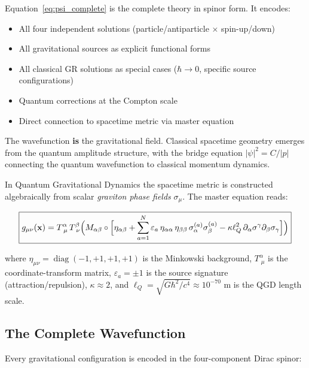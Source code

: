 \documentclass[11pt,a4paper]{article}
\theoremstyle{definition}
\theoremstyle{remark}
\newcommand{\sig}[2]{\sigma_{#1}^{(#2)}}
\newcommand{\lQ}{\ell_{Q}}
\newcommand{\boldx}{\mathbf{x}}
\begin{document}
	Equation~\eqref{eq:psi_complete} is the complete theory in spinor form. It encodes:
	
	\begin{itemize}
		\item All four independent solutions (particle/antiparticle $\times$ spin-up/down)
		\item All gravitational sources as explicit functional forms
		\item All classical GR solutions as special cases ($\hbar \to 0$, specific source configurations)
		\item Quantum corrections at the Compton scale
		\item Direct connection to spacetime metric via master equation
	\end{itemize}
	
	The wavefunction \textbf{is} the gravitational field. Classical spacetime geometry emerges from the quantum amplitude structure, with the bridge equation $|\psi|^2 = C/|p|$ connecting the quantum wavefunction to classical momentum dynamics.
	
	
	In Quantum Gravitational Dynamics the spacetime metric is constructed
	algebraically from scalar \emph{graviton phase fields} $\sigma_\mu$.
	The master equation reads:
	
	\begin{equation}\label{eq:master}
		\boxed{
			g_{\mu\nu}(\boldx)
			= T^{\alpha}_{\;\mu}\,T^{\beta}_{\;\nu}
			\Bigl(
			M_{\alpha\beta}\circ
			\Bigl[
			\eta_{\alpha\beta}
			+ \sum_{a=1}^{N}\varepsilon_a\,
			\eta_{\alpha\alpha}\,\eta_{\beta\beta}\,
			\sig{\alpha}{a}\sig{\beta}{a}
			- \kappa\lQ^{2}\,\partial_\alpha\sigma^\gamma\partial_\beta\sigma_\gamma
			\Bigr]
			\Bigr)
		}
	\end{equation}
	
	where $\eta_{\mu\nu}=\operatorname{diag}(-1,+1,+1,+1)$ is the
	Minkowski background, $T^{\alpha}_{\;\mu}$ is the coordinate-transform
	matrix, $\varepsilon_a=\pm 1$ is the source signature
	(attraction/repulsion), $\kappa\approx 2$, and
	$\lQ=\sqrt{G\hbar^2/c^4}\approx 10^{-70}$ m is the QGD length scale.
	
	\subsection{The Complete Wavefunction}
	
	Every gravitational configuration is encoded in the four-component Dirac spinor:
	
\end{document}
